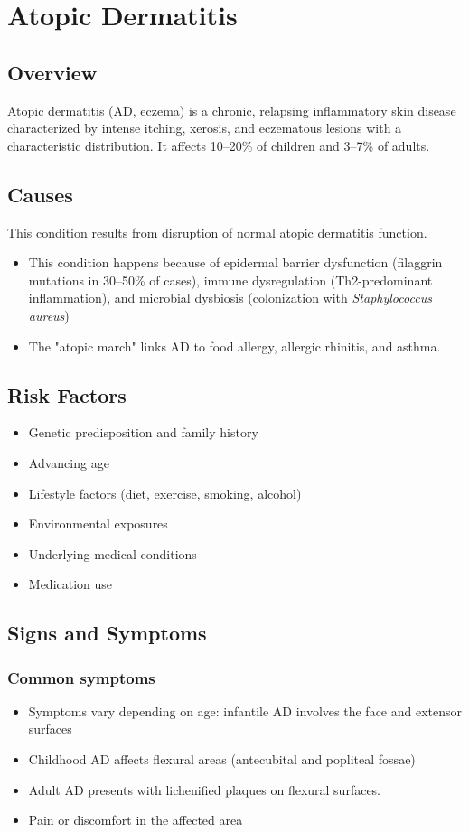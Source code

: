 \chapter{Atopic Dermatitis}
\label{sec:Atopic Dermatitis}

\section{Overview}
Atopic dermatitis (AD, eczema) is a chronic, relapsing inflammatory skin disease characterized by intense itching, xerosis, and eczematous lesions with a characteristic distribution. It affects 10--20\% of children and 3--7\% of adults.
\section{Causes}
This condition results from disruption of normal atopic dermatitis function.

\begin{itemize}[noitemsep]
  \item This condition happens because of epidermal barrier dysfunction (filaggrin mutations in 30--50\% of cases), immune dysregulation (Th2-predominant inflammation), and microbial dysbiosis (colonization with \textit{Staphylococcus aureus})
  \item The "atopic march" links AD to food allergy, allergic rhinitis, and asthma.
\end{itemize}
\section{Risk Factors}


\begin{itemize}[noitemsep]
  \item Genetic predisposition and family history
  \item Advancing age
  \item Lifestyle factors (diet, exercise, smoking, alcohol)
  \item Environmental exposures
  \item Underlying medical conditions
  \item Medication use
\end{itemize}
\section{Signs and Symptoms}

\subsection{Common symptoms}
\begin{itemize}[noitemsep]
  \item Symptoms vary depending on age: infantile AD involves the face and extensor surfaces
  \item Childhood AD affects flexural areas (antecubital and popliteal fossae)
  \item Adult AD presents with lichenified plaques on flexural surfaces.
  \item Pain or discomfort in the affected area
  \end{itemize}

